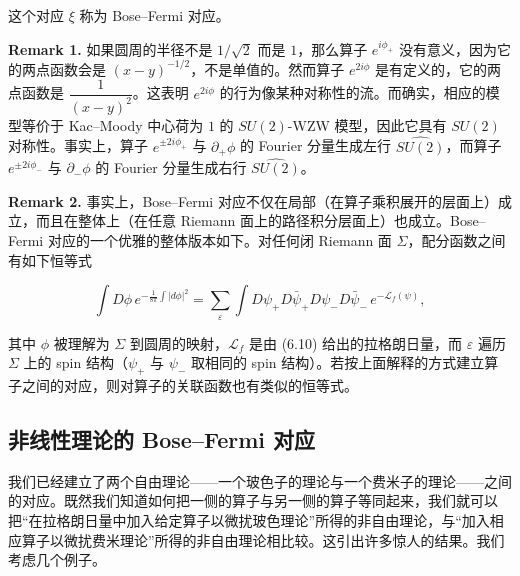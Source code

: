 这个对应 $\xi$ 称为 Bose–Fermi 对应。


\textbf{Remark 1.} 如果圆周的半径不是 $1/\sqrt2$ 而是 $1$，那么算子 $e^{i\phi_+}$ 没有意义，因为它的两点函数会是 $(x-y)^{-1/2}$，不是单值的。然而算子 $e^{2i\phi}$ 是有定义的，它的两点函数是 $\dfrac{1}{(x-y)^2}$。这表明 $e^{2i\phi}$ 的行为像某种对称性的流。而确实，相应的模型等价于 Kac–Moody 中心荷为 $1$ 的 $SU(2)$-WZW 模型，因此它具有 $SU(2)$ 对称性。事实上，算子 $e^{\pm2i\phi_+}$ 与 $\partial_+\phi$ 的 Fourier 分量生成左行 $\widehat{SU(2)}$，而算子 $e^{\pm2i\phi_-}$ 与 $\partial_-\phi$ 的 Fourier 分量生成右行 $\widehat{SU(2)}$。

\textbf{Remark 2.} 事实上，Bose–Fermi 对应不仅在局部（在算子乘积展开的层面上）成立，而且在整体上（在任意 Riemann 面上的路径积分层面上）也成立。Bose–Fermi 对应的一个优雅的整体版本如下。对任何闭 Riemann 面 $\Sigma$，配分函数之间有如下恒等式

\begin{equation}
  \tag{6.17}
  \label{eq:6-17}
  \int D\phi\,e^{-\frac{1}{8\pi}\int|d\phi|^2}=\sum_{\varepsilon}\int D\psi_+D\bar\psi_+D\psi_-D\bar\psi_-\,e^{-\mathcal{L}_f(\psi)},
\end{equation}

其中 $\phi$ 被理解为 $\Sigma$ 到圆周的映射，$\mathcal{L}_f$ 是由 (6.10) 给出的拉格朗日量，而 $\varepsilon$ 遍历 $\Sigma$ 上的 spin 结构（$\psi_+$ 与 $\psi_-$ 取相同的 spin 结构）。若按上面解释的方式建立算子之间的对应，则对算子的关联函数也有类似的恒等式。

\subsection{非线性理论的 Bose–Fermi 对应}

我们已经建立了两个自由理论——一个玻色子的理论与一个费米子的理论——之间的对应。既然我们知道如何把一侧的算子与另一侧的算子等同起来，我们就可以把“在拉格朗日量中加入给定算子以微扰玻色理论”所得的非自由理论，与“加入相应算子以微扰费米理论”所得的非自由理论相比较。这引出许多惊人的结果。我们考虑几个例子。


